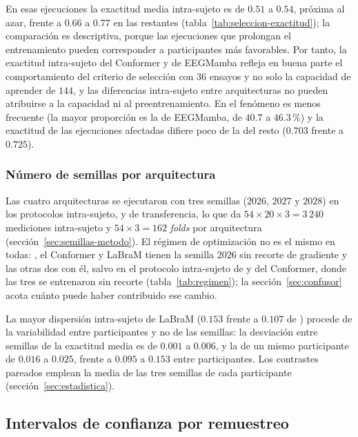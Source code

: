 En esas ejecuciones la exactitud media intra-sujeto es de $0.51$ a $0.54$, próxima al azar, frente a
$0.66$ a $0.77$ en las restantes (tabla~\ref{tab:seleccion-exactitud}); la comparación es descriptiva,
porque las ejecuciones que prolongan el entrenamiento pueden corresponder a participantes más
favorables. Por tanto, la exactitud intra-sujeto del Conformer y de EEGMamba refleja en buena parte el
comportamiento del criterio de selección con $36$ ensayos y no solo la capacidad de aprender de $144$,
y las diferencias intra-sujeto entre arquitecturas no pueden atribuirse a la capacidad ni al
preentrenamiento. En \loso{} el fenómeno es menos frecuente (la mayor proporción es la de EEGMamba,
de $40.7$ a $46.3$\,\%) y la exactitud de las ejecuciones afectadas difiere poco de la del resto
($0.703$ frente a $0.725$).

\subsubsection{Número de semillas por arquitectura}
\label{sec:semillas-por-arq}

Las cuatro arquitecturas se ejecutaron con tres semillas ($2026$, $2027$ y $2028$) en los protocolos
intra-sujeto, \loso{} y de transferencia, lo que da $54 \times 20 \times 3 = 3\,240$ mediciones
intra-sujeto y $54 \times 3 = 162$ \textit{folds} \loso{} por arquitectura
(sección~\ref{sec:semillas-metodo}). El régimen de optimización no es el mismo en todas: \eegnet{}, el
Conformer y LaBraM tienen la semilla $2026$ sin recorte de gradiente y las otras dos con él, salvo en el
protocolo intra-sujeto de \eegnet{} y del Conformer, donde las tres se entrenaron sin recorte
(tabla~\ref{tab:regimen}); la sección~\ref{sec:confusor} acota cuánto puede haber contribuido ese cambio.

La mayor dispersión intra-sujeto de LaBraM ($0.153$ frente a $0.107$ de \eegnet{}) procede de la
variabilidad entre participantes y no de las semillas: la desviación entre semillas de la exactitud media
es de $0.001$ a $0.006$, y la de un mismo participante de $0.016$ a $0.025$, frente a $0.095$ a $0.153$
entre participantes. Los contrastes pareados emplean la media de las tres semillas de cada participante
(sección~\ref{sec:estadistica}).

\subsection{Intervalos de confianza por remuestreo}
\label{sec:bootstrap-resultados}

